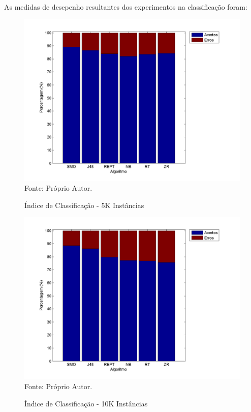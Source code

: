 \documentclass[
	12pt,				%
	openright,			%
	oneside,	
	a4paper,				%
	english,				%
	brazil				%
]{abntex2/abntex2} %
\begin{document}
	As medidas de desepenho resultantes dos experimentos na classificação foram: 
	\\
	\begin{figure}[!htb]
		\caption{\label{figperHits5k} Índice de Classificação - 5K Instâncias}
		\begin{center}
			\includegraphics[scale=0.8]{graphs/perc_hits_5k.png}
				Fonte: Próprio Autor.
		\end{center}
	\end{figure}
	
	\begin{figure}[!htb]
		\caption{\label{figperHits10k} Índice de Classificação - 10K Instâncias}
		\begin{center}
			\includegraphics[scale=0.8]{graphs/perc_hits_10k.png}
		Fonte: Próprio Autor.
		\end{center}
	\end{figure}
	
\end{document}
